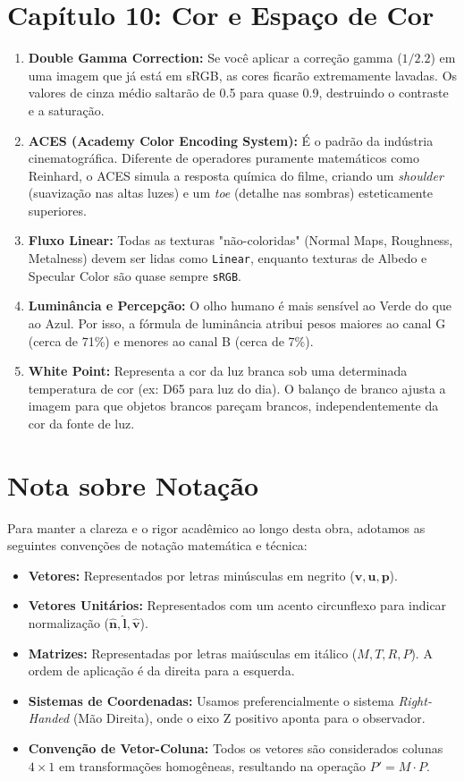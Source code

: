 \section*{Capítulo 10: Cor e Espaço de Cor}
\begin{enumerate}
    \item \textbf{Double Gamma Correction:} Se você aplicar a correção gamma ($1/2.2$) em uma imagem que já está em sRGB, as cores ficarão extremamente lavadas. Os valores de cinza médio saltarão de 0.5 para quase 0.9, destruindo o contraste e a saturação.
    \item \textbf{ACES (Academy Color Encoding System):} É o padrão da indústria cinematográfica. Diferente de operadores puramente matemáticos como Reinhard, o ACES simula a resposta química do filme, criando um \textit{shoulder} (suavização nas altas luzes) e um \textit{toe} (detalhe nas sombras) esteticamente superiores.
    \item \textbf{Fluxo Linear:} Todas as texturas "não-coloridas" (Normal Maps, Roughness, Metalness) devem ser lidas como \texttt{Linear}, enquanto texturas de Albedo e Specular Color são quase sempre \texttt{sRGB}.
    \item \textbf{Luminância e Percepção:} O olho humano é mais sensível ao Verde do que ao Azul. Por isso, a fórmula de luminância atribui pesos maiores ao canal G (cerca de 71\%) e menores ao canal B (cerca de 7\%).
    \item \textbf{White Point:} Representa a cor da luz branca sob uma determinada temperatura de cor (ex: D65 para luz do dia). O balanço de branco ajusta a imagem para que objetos brancos pareçam brancos, independentemente da cor da fonte de luz.
\end{enumerate}

\section*{Nota sobre Notação}
Para manter a clareza e o rigor acadêmico ao longo desta obra, adotamos as seguintes convenções de notação matemática e técnica:
\begin{itemize}
    \item \textbf{Vetores:} Representados por letras minúsculas em negrito ($\mathbf{v}, \mathbf{u}, \mathbf{p}$).
    \item \textbf{Vetores Unitários:} Representados com um acento circunflexo para indicar normalização ($\hat{\mathbf{n}}, \hat{\mathbf{l}}, \hat{\mathbf{v}}$).
    \item \textbf{Matrizes:} Representadas por letras maiúsculas em itálico ($M, T, R, P$). A ordem de aplicação é da direita para a esquerda.
    \item \textbf{Sistemas de Coordenadas:} Usamos preferencialmente o sistema \textit{Right-Handed} (Mão Direita), onde o eixo Z positivo aponta para o observador.
    \item \textbf{Convenção de Vetor-Coluna:} Todos os vetores são considerados colunas $4 \times 1$ em transformações homogêneas, resultando na operação $P' = M \cdot P$.
\end{itemize}

